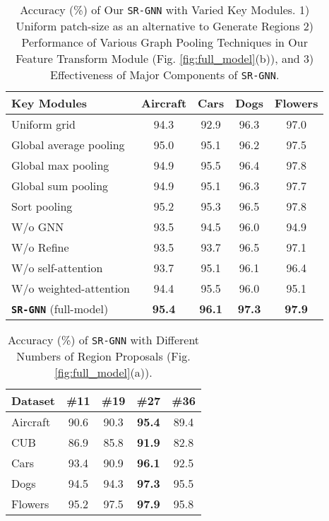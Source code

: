 \documentclass[journal]{IEEEtran}
\begin{document}
\begin{table} \begin{center}
 \caption{Accuracy (\%) of Our \texttt{SR-GNN} with Varied Key Modules. 1) Uniform patch-size as an alternative to  Generate Regions 2) Performance of Various Graph Pooling Techniques in Our Feature Transform Module (Fig. \ref{fig:full_model}(b)), and 3) Effectiveness of Major Components of \texttt{SR-GNN}. }
 \label{table:Abln1}
\begin{tabular}{|l| c c c c |}
 \hline
   Key Modules  & Aircraft & Cars &  Dogs & Flowers   \\
   \hline  
 Uniform  grid & 94.3 & 92.9 & 96.3 & 97.0  \\
 \hline
Global average pooling & 95.0 & 95.1 & 96.2 &97.5 \\
Global max pooling &94.9 &95.5 &96.4 & 97.8 \\
Global sum pooling \cite{xu2018powerful} & 94.9 & 95.1 & 96.3 & 97.7  \\
Sort pooling \cite{zhang2018end} & 95.2 & 95.3 & 96.5 & 97.8  \\
 \hline
 W/o  GNN  & 93.5 & 94.5 & 96.0 & 94.9   \\
 W/o Refine & 93.5 & 93.7& 96.5 & 97.1\\
 W/o self-attention & 93.7 & 95.1 & 96.1 & 96.4  \\
  W/o weighted-attention & 94.4 & 95.5 & 96.0 & 95.1   \\
\hline
\textbf{\texttt{SR-GNN}} (full-model) & \textbf{95.4}  &\textbf{96.1} &\textbf{97.3} & \textbf{97.9} \\
\hline
\end{tabular}
 \end{center}
 \vspace{-0.3cm}
\end{table}
\begin{table}
\begin{center}
 \caption{Accuracy (\%) of \texttt{SR-GNN} with Different Numbers of Region Proposals (Fig. \ref{fig:full_model}(a)). }
 \label{table:RoI}

\begin{tabular}{|l| c c c c|}
 \hline
    Dataset & \#11 & \#19 & \#27 & \#36 \\
    \hline 
  Aircraft & 90.6 & 90.3 & \textbf{95.4} & 89.4  \\
  CUB &  86.9 & 85.8 & \textbf{91.9} & 82.8\\ 
Cars & 93.4 & 90.9 & \textbf{96.1} & 92.5  \\
  Dogs &  94.5 & 94.3 & \textbf{97.3} & 95.5\\ 
  Flowers & 95.2 & 97.5 & \textbf{97.9} & 95.8\\
\hline
\end{tabular}
 \end{center}
 \vspace{-0.5 cm}
\end{table}
\end{document}
